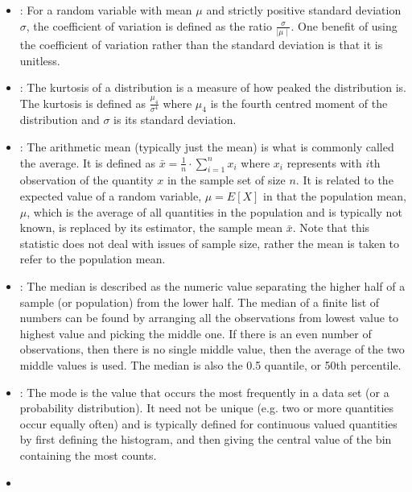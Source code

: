 \documentclass[draftspec]{sbmlpkgspec}
\begin{document}
\begin{itemize}

\item {}:  For a random variable with mean $ \mu $ and strictly positive standard deviation $ \sigma $, the coefficient of variation is defined as the ratio $ \frac{\sigma}{\mid\mu\mid} $. One benefit of using the coefficient of variation rather than the standard deviation is that it is unitless.

\item {}:  The kurtosis of a distribution is a measure of how peaked the distribution is. The kurtosis is defined as $  \frac{\mu_4}{\sigma^4} $ where $ \mu_4 $ is the fourth centred moment of the distribution and $ \sigma $ is its standard deviation.

\item {}:  The arithmetic mean (typically just the mean) is what is commonly called the average. It is defined as $ \bar{x} = \frac{1}{n}\cdot \sum_{i=1}^n{x_i} $ where $ x_i $ represents with $ i $th observation of the quantity $ x $ in the sample set of size $ n $. It is related to the expected value of a random variable, $ \mu = E[X] $ in that the population mean, $ \mu $, which is the average of all quantities in the population and is typically not known, is replaced by its estimator, the sample mean $ \bar{x} $. Note that this statistic does not deal with issues of sample size, rather the mean is taken to refer to the population mean.

\item {}:  The median is described as the numeric value separating the higher half of a sample (or population) from the lower half. The median of a finite list of numbers can be found by arranging all the observations from lowest value to highest value and picking the middle one. If there is an even number of observations, then there is no single middle value, then the average of the two middle values is used. The median is also the 0.5 quantile, or 50th percentile.

\item {}:  The mode is the value that occurs the most frequently in a data set (or a probability distribution). It need not be unique (e.g. two or more quantities occur equally often) and is typically defined for continuous valued quantities by first defining the histogram, and then giving the central value of the bin containing the most counts.

\item {}


\end{itemize}
\end{document}
